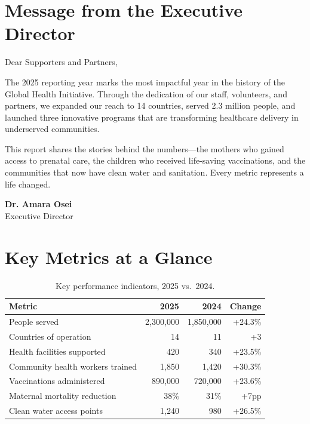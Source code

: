 \documentclass[
    language=english,
    doctype=impact-report,
    institution=none,
]{../../omnilatex}
\begin{document}
\maketitle

\section*{Message from the Executive Director}

Dear Supporters and Partners,

The 2025 reporting year marks the most impactful year in the history of the
Global Health Initiative. Through the dedication of our staff, volunteers,
and partners, we expanded our reach to 14 countries, served 2.3 million
people, and launched three innovative programs that are transforming
healthcare delivery in underserved communities.

This report shares the stories behind the numbers---the mothers who gained
access to prenatal care, the children who received life-saving vaccinations,
and the communities that now have clean water and sanitation. Every metric
represents a life changed.

\vspace{1em}
\noindent\textbf{Dr. Amara Osei}\\
Executive Director

\section{Key Metrics at a Glance}

\begin{table}[h]
    \centering
    \begin{tabular}{lrrr}
        \toprule
        \textbf{Metric} & \textbf{2025} & \textbf{2024} & \textbf{Change} \\
        \midrule
        People served & 2,300,000 & 1,850,000 & +24.3\% \\
        Countries of operation & 14 & 11 & +3 \\
        Health facilities supported & 420 & 340 & +23.5\% \\
        Community health workers trained & 1,850 & 1,420 & +30.3\% \\
        Vaccinations administered & 890,000 & 720,000 & +23.6\% \\
        Maternal mortality reduction & 38\% & 31\% & +7pp \\
        Clean water access points & 1,240 & 980 & +26.5\% \\
        \bottomrule
    \end{tabular}
    \caption{Key performance indicators, 2025 vs.\ 2024.}
\end{table}
\end{document}
